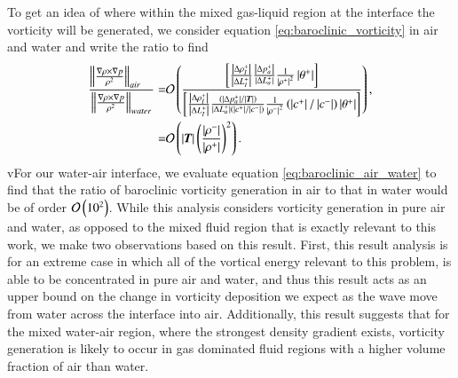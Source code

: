 To get an idea of where within the mixed gas-liquid region at the
interface the vorticity will be generated, we consider equation
\eqref{eq:baroclinic_vorticity} in air and water and write the ratio
to find
\begin{align}%
  \label{eq:baroclinic_air_water}%
  \frac{\norm{\frac{\nabla\rho\times\nabla p}{\rho^2}}_{air\quad}}{\norm{\frac{\nabla\rho\times\nabla p}{\rho^2}}_{water}}
  =&\orderof{\frac{\left[\frac{\abs{\Delta \rho_I^+}}{\abs{\Delta L_I^+}}\frac{\abs{\Delta p_a^+}}{\abs{\Delta L_a^+}}\frac{1}{\abs{\rho^+}^2}\abs{\theta^+}\right]}
     {\left[\frac{\abs{\Delta \rho_I^+}}{\abs{\Delta L_I^+}}\frac{\left(\abs{\Delta p_a^+}/\abs{\bs{T}}\right)}{\abs{\Delta L_a^+}\left(\abs{c^+}/\abs{c^-}\right)}\frac{1}{\abs{\rho^-}^2}\left(\abs{c^+}/\abs{c^-}\right)\abs{\theta^+}\right]}},\nonumber\\%
  =&\orderof{\abs{\bs{T}}\left(\frac{\abs{\rho^-}}{\abs{\rho^+}}\right)^2}.%
\end{align}
vFor our water-air interface, we evaluate equation
\eqref{eq:baroclinic_air_water} to find that the ratio of baroclinic
vorticity generation in air to that in water would be of order
$\mathcal{O}\left(10^2\right)$. While this analysis considers vorticity generation
in pure air and water, as opposed to the mixed fluid region that is
exactly relevant to this work, we make two observations based on this
result. First, this result analysis is for an extreme case in which
all of the vortical energy relevant to this problem, is able to be
concentrated in pure air and water, and thus this result acts as an
upper bound on the change in vorticity deposition we expect as the
wave move from water across the interface into air. Additionally, this
result suggests that for the mixed water-air region, where the
strongest density gradient exists, vorticity generation is likely to
occur in gas dominated fluid regions with a higher volume fraction of
air than water.
